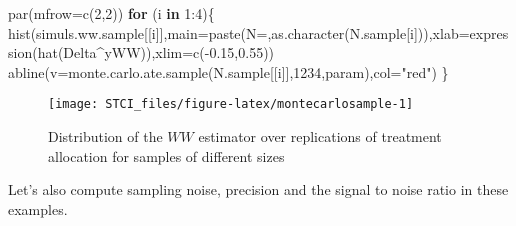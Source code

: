 \documentclass[
]{book}
\newenvironment{Shaded}{\begin{snugshade}}{\end{snugshade}}
\newcommand{\AttributeTok}[1]{\textcolor[rgb]{0.77,0.63,0.00}{#1}}
\newcommand{\ControlFlowTok}[1]{\textcolor[rgb]{0.13,0.29,0.53}{\textbf{#1}}}
\newcommand{\DecValTok}[1]{\textcolor[rgb]{0.00,0.00,0.81}{#1}}
\newcommand{\FloatTok}[1]{\textcolor[rgb]{0.00,0.00,0.81}{#1}}
\newcommand{\FunctionTok}[1]{\textcolor[rgb]{0.00,0.00,0.00}{#1}}
\newcommand{\NormalTok}[1]{#1}
\newcommand{\SpecialCharTok}[1]{\textcolor[rgb]{0.00,0.00,0.00}{#1}}
\newcommand{\StringTok}[1]{\textcolor[rgb]{0.31,0.60,0.02}{#1}}
\theoremstyle{definition}
\theoremstyle{definition}
\theoremstyle{definition}
\theoremstyle{definition}
\theoremstyle{remark}
\begin{document}
\begin{Shaded}
\begin{Highlighting}[]
\FunctionTok{par}\NormalTok{(}\AttributeTok{mfrow=}\FunctionTok{c}\NormalTok{(}\DecValTok{2}\NormalTok{,}\DecValTok{2}\NormalTok{))}
\ControlFlowTok{for}\NormalTok{ (i }\ControlFlowTok{in} \DecValTok{1}\SpecialCharTok{:}\DecValTok{4}\NormalTok{)\{}
  \FunctionTok{hist}\NormalTok{(simuls.ww.sample[[i]],}\AttributeTok{main=}\FunctionTok{paste}\NormalTok{(}\StringTok{\textquotesingle{}N=\textquotesingle{}}\NormalTok{,}\FunctionTok{as.character}\NormalTok{(N.sample[i])),}\AttributeTok{xlab=}\FunctionTok{expression}\NormalTok{(}\FunctionTok{hat}\NormalTok{(Delta}\SpecialCharTok{\^{}}\NormalTok{yWW)),}\AttributeTok{xlim=}\FunctionTok{c}\NormalTok{(}\SpecialCharTok{{-}}\FloatTok{0.15}\NormalTok{,}\FloatTok{0.55}\NormalTok{))}
  \FunctionTok{abline}\NormalTok{(}\AttributeTok{v=}\FunctionTok{monte.carlo.ate.sample}\NormalTok{(N.sample[[i]],}\DecValTok{1234}\NormalTok{,param),}\AttributeTok{col=}\StringTok{"red"}\NormalTok{)}
\NormalTok{\}}
\end{Highlighting}
\end{Shaded}

\begin{figure}[htbp]

{\centering \texttt{[image: STCI\_files/figure-latex/montecarlosample-1]} 

}

\caption{Distribution of the $WW$ estimator over replications of treatment allocation for samples of different sizes}\label{fig:montecarlosample}
\end{figure}

Let's also compute sampling noise, precision and the signal to noise ratio in these examples.
\end{document}
